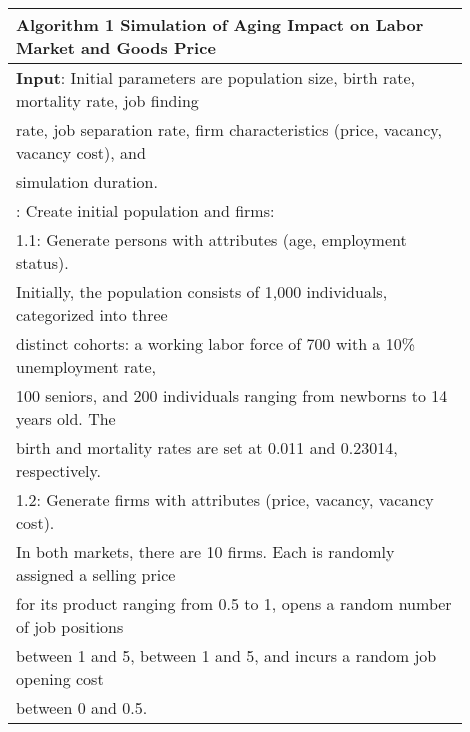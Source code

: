 \documentclass[ %
    final,
    scrbook,
    listoffigures,
    listoftables, 
    glossary]{cu-thesis}
\begin{document}
\begin{flushleft}
\begin{longtable}{p{0.9\linewidth}}
\label{tab:alg1}
\toprule
\textbf{Algorithm 1} Simulation of Aging Impact on Labor Market and Goods Price\\ \midrule
\textbf{Input}: Initial parameters are population size, birth rate, mortality rate, job finding\\ 
\hspace{5mm}rate, job separation rate, firm characteristics (price, vacancy, vacancy cost), and \\
\hspace{5mm}simulation duration. \\
\noindent 1: Create initial population and firms: \\
\hspace{5mm}1.1: Generate persons with attributes (age, employment status).\\
\hspace{10mm}Initially, the population consists of 1,000 individuals, categorized into three\\ 
\hspace{10mm}distinct cohorts: a working labor force of 700 with a 10\% unemployment rate, \\
\hspace{10mm}100 seniors, and 200 individuals ranging from newborns to 14 years old. The\\
\hspace{10mm}birth and mortality rates are set at 0.011 and 0.23014, respectively.\\
\hspace{5mm}1.2: Generate firms with attributes (price, vacancy, vacancy cost). \\
\hspace{10mm}In both markets, there are 10 firms. Each is randomly assigned a selling price\\
\hspace{10mm}for its product ranging from 0.5 to 1, opens a random number of job positions\\
\hspace{10mm}between 1 and 5, between 1 and 5, and incurs a random job opening cost\\
\hspace{10mm}between 0 and 0.5.\\

\end{longtable}
\end{flushleft}
\end{document}
